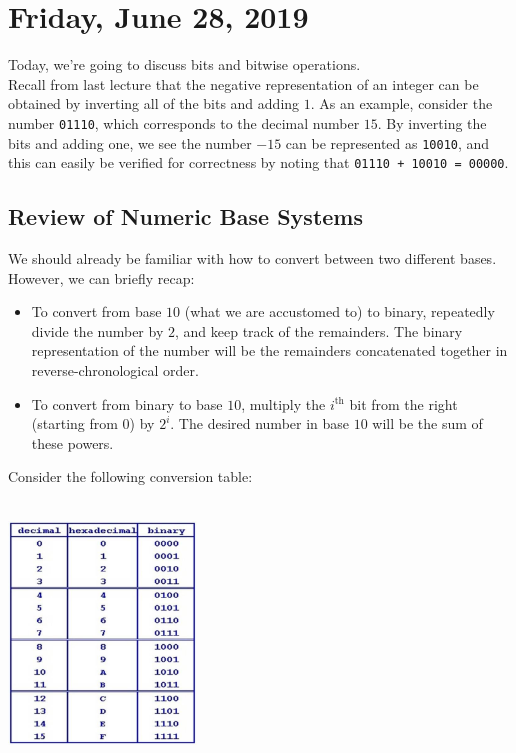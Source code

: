 \section{Friday, June 28, 2019}

Today, we're going to discuss bits and bitwise operations. \\


Recall from last lecture that the negative representation of an integer can be obtained by inverting all of the bits and adding $1$. As an example, consider the number \texttt{01110}, which corresponds to the decimal number $15$. By inverting the bits and adding one, we see the number $-15$ can be represented as \texttt{10010}, and this can easily be verified for correctness by noting that \verb!01110 + 10010 = 00000!. 

\subsection{Review of Numeric Base Systems}
We should already be familiar with how to convert between two different bases. However, we can briefly recap:

\begin{itemize}
    \item To convert from base $10$ (what we are accustomed to) to binary, repeatedly divide the number by $2$, and keep track of the remainders. The binary representation of the number will be the remainders concatenated together in reverse-chronological order. 
    \item To convert from binary to base $10$, multiply the $i^{\text{th}}$ bit from the right (starting from $0$) by $2^{i}$. The desired number in base $10$ will be the sum of these powers. 
\end{itemize}

Consider the following conversion table:

\begin{center}
\includegraphics[width=5cm, height=7cm]{june28/table}
\label{conversiontable:1}
\end{center}

